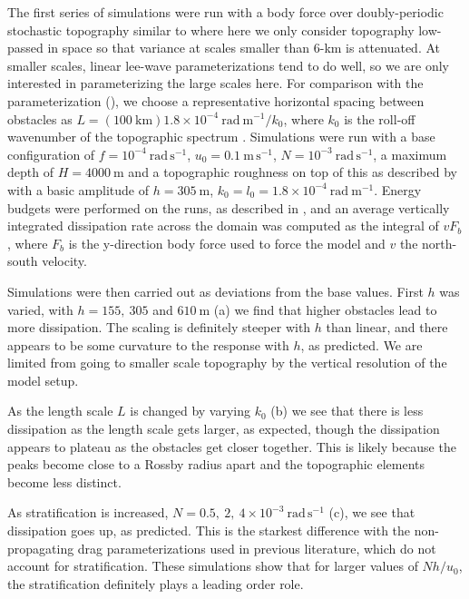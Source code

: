 \documentclass[twocol]{ametsocV5}
\begin{document}
The first series of simulations were run with a body force over doubly-periodic stochastic topography similar to \citet{klymak18} where here we only consider topography low-passed in space so that variance at scales smaller than 6-km is attenuated.  At smaller scales, linear lee-wave parameterizations tend to do well, so we are only interested in parameterizing the large scales here.  For comparison with the parameterization (), we choose a representative horizontal spacing between obstacles as $L = \left(100 \ \mathrm{km}\right) 1.8 \times 10^{-4}\ \mathrm{rad\ m^{-1}} / k_0$, where $k_0$ is the roll-off wavenumber of the topographic spectrum \citep{klymak18}.  Simulations were run with a base configuration of $f=10^{-4}\ \mathrm{rad\, s^{-1}}$, $u_0=0.1\ \mathrm{m\,s^{-1}}$, $N=10^{-3}\ \mathrm{rad\, s^{-1}}$, a maximum depth of $H=4000\ \mathrm{m}$ and a topographic roughness on top of this as described by  with a basic amplitude of $h = 305\ \mathrm{m}$, $k_0 = l_0 = 1.8\times10^{-4}\ \mathrm{rad\ m^{-1}}$. Energy budgets were performed on the runs, as described in \citep{klymak18}, and an average vertically integrated dissipation rate across the domain was computed as the integral of $v F_b$, where $F_b$ is the y-direction body force used to force the model and $v$ the north-south velocity.


Simulations were then carried out as deviations from the base values.  First $h$ was varied, with $h = 155,\ 305$ and $610\ \mathrm{m}$ (a) we find that higher obstacles lead to more dissipation.  The scaling is definitely steeper with $h$ than linear, and there appears to be some curvature to the response with $h$, as predicted.  We are limited from going to smaller scale topography by the vertical resolution of the model setup.  


As the length scale $L$ is changed by varying  $k_0$ (b) we see that there is less dissipation as the length scale gets larger, as expected, though the dissipation appears to plateau as the obstacles get closer together.  This is likely because the peaks become close to a Rossby radius apart and the topographic elements become less distinct.  

As stratification is increased, $N = 0.5,\ 2,\ 4\times 10^{-3}\ \mathrm{rad\, s^{-1}}$ (c), we see that dissipation goes up, as predicted.  This is the starkest difference with the non-propagating drag parameterizations used in previous literature, which do not account for stratification.  These simulations show that for  larger values of $Nh/u_0$, the stratification definitely plays a leading order role.  
\end{document}
